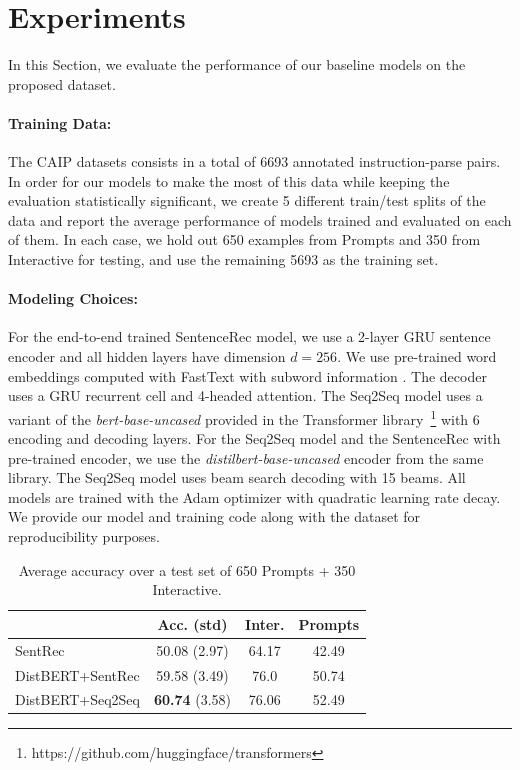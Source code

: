 \section{Experiments}
\label{sec:experiments}

In this Section, we evaluate the performance of our baseline models on the proposed dataset.

\paragraph{Training Data: }
The CAIP datasets consists in a total of 6693 annotated instruction-parse pairs. In order for our models to make the most of this data while keeping the evaluation statistically significant, we create 5 different train/test splits of the data and report the average performance of models trained and evaluated on each of them. In each case, we hold out 650 examples from Prompts and 350 from Interactive for testing, and use the remaining 5693 as the training set.

\paragraph{Modeling Choices: }  For the end-to-end trained SentenceRec model, we use a 2-layer GRU sentence encoder and all hidden layers have dimension $d=256$. We use pre-trained word embeddings computed with FastText with subword information \citep{BojanowskiGJM17}. The decoder uses a GRU recurrent cell and 4-headed attention. The Seq2Seq model uses a variant of the {\emph{bert-base-uncased}} provided in the Transformer library~\footnote{https://github.com/huggingface/transformers} with 6 encoding and decoding layers. For the Seq2Seq model and the SentenceRec with pre-trained encoder, we use the {\emph{distilbert-base-uncased}} encoder from the same library. The Seq2Seq model uses beam search decoding with 15 beams. All models are trained with the Adam optimizer with quadratic learning rate decay. We provide our model and training code along with the dataset for reproducibility purposes.

\begin{table}
\small
\center
\begin{tabular}{l|ccc}
                   & Acc. (std)     & Inter. & Prompts \\
\midrule
SentRec            & 50.08 (2.97)   & 64.17  & 42.49 \\
DistBERT+SentRec   & 59.58 (3.49)   & 76.0   & 50.74 \\
DistBERT+Seq2Seq   & {\bf{60.74}} (3.58)   & 76.06  & 52.49
\end{tabular}
\caption{\label{tab:main-results} Average accuracy over a test set of 650 Prompts + 350 Interactive.}
\end{table}

